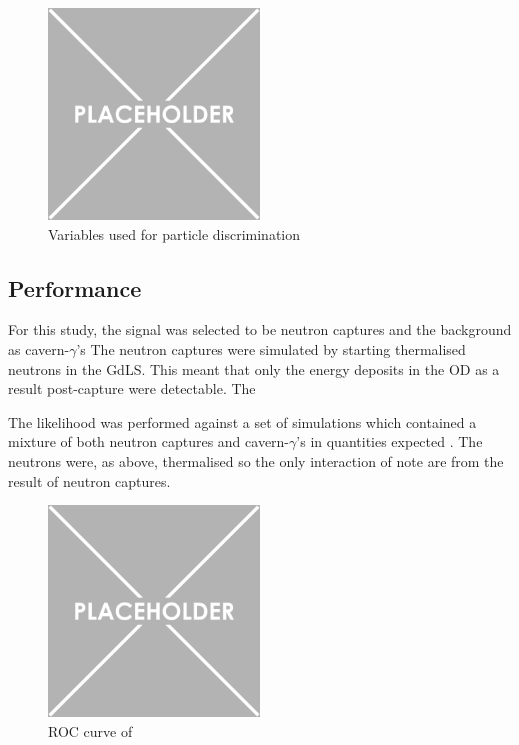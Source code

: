 \begin{figure}[!htbp]
    \centering
    \includegraphics[width=0.5\textwidth]{Figures/Placeholder.png}
    \caption{Variables used for particle discrimination}
    \label{fig:discrimination_variables}
\end{figure}


\subsection{Performance}
\par
For this study, the signal was selected to be neutron captures and the background as cavern-$\gamma$'s
The neutron captures were simulated by starting thermalised neutrons in the GdLS.
This meant that only the energy deposits in the OD as a result post-capture were detectable.
The 
\par
The likelihood was performed against a set of simulations which contained a mixture of both neutron captures and cavern-$\gamma$'s in quantities expected \cite{LZ_assay_ref}.
The neutrons were, as above, thermalised so the only interaction of note are from the result of neutron captures.






\begin{figure}[!htbp]
    \centering
    \includegraphics[width=0.5\textwidth]{Figures/Placeholder.png}
    \caption{ROC curve of}
    \label{fig:discrimination_performance}
\end{figure}

